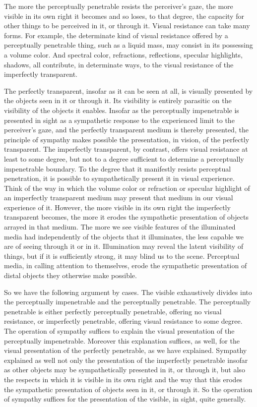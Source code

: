\documentclass[12pt]{article}
\begin{document}
The more the perceptually penetrable resists the perceiver's gaze, the more visible in its own right it becomes and so loses, to that degree, the capacity for other things to be perceived in it, or through it. Visual resistance can take many forms. For example, the determinate kind of visual resistance offered by a perceptually penetrable thing, such as a liquid mass, may consist in its possessing a volume color. And spectral color, refractions, reflections, specular highlights, shadows, all contribute, in determinate ways, to the visual resistance of the imperfectly transparent.

The perfectly transparent, insofar as it can be seen at all, is visually presented by the objects seen in it or through it. Its visibility is entirely parasitic on the visibility of the objects it enables. Insofar as the perceptually impenetrable is presented in sight as a sympathetic response to the experienced limit to the perceiver's gaze, and the perfectly transparent medium is thereby presented, the principle of sympathy makes possible the presentation, in vision, of the perfectly transparent. The imperfectly transparent, by contrast, offers visual resistance at least to some degree, but not to a degree sufficient to determine a perceptually impenetrable boundary. To the degree that it manifestly resists perceptual penetration, it is possible to sympathetically present it in visual experience. Think of the way in which the volume color or refraction or specular highlight of an imperfectly transparent medium may present that medium in our visual experience of it. However, the more visible in its own right the imperfectly transparent becomes, the more it erodes the sympathetic presentation of objects arrayed in that medium. The more we see visible features of the illuminated media had independently of the objects that it illuminates, the less capable we are of seeing through it or in it. Illumination may reveal the latent visibility of things, but if it is sufficiently strong, it may blind us to the scene. Perceptual media, in calling attention to themselves, erode the sympathetic presentation of distal objects they otherwise make possible.

So we have the following argument by cases. The visible exhaustively divides into the perceptually impenetrable and the perceptually penetrable. The perceptually penetrable is either perfectly perceptually penetrable, offering no visual resistance, or imperfectly penetrable, offering visual resistance to some degree. The operation of sympathy suffices to explain the visual presentation of the perceptually impenetrable. Moreover this explanation suffices, as well, for the visual presentation of the perfectly penetrable, as we have explained. Sympathy explained as well not only the presentation of the imperfectly penetrable insofar as other objects may be sympathetically presented in it, or through it, but also the respects in which it is visible in its own right and the way that this erodes the sympathetic presentation of objects seen in it, or through it. So the operation of sympathy suffices for the presentation of the visible, in sight, quite generally.
\end{document}
